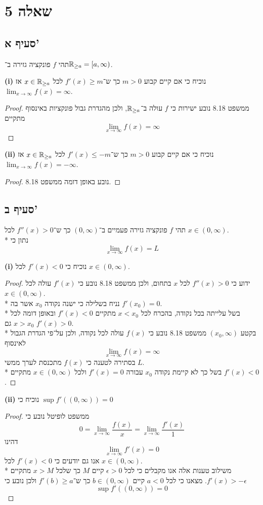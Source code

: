 \section{שאלה 5}
\subsection{סעיף א'}
תהי $f$ פונקציה גזירה ב־$\mathbb{R}_{\ge a} = [a, \infty)$. %

\textbf{(i)}
נוכיח כי אם קיים קבוע $m > 0$ כך ש־$f'(x) \ge m$ לכל $x \in \mathbb{R}_{\ge a}$ אז $\lim_{x \to \infty} f(x) = \infty$.
\begin{proof}
	ממשפט 8.18 נובע ישירות כי $f$ עולה ב־$\mathbb{R}_{\ge a}$, ולכן מהגדרת גבול פונקציות באינסוף מתקיים
	\[
		\lim_{x \to \infty} f(x) = \infty
	\]
\end{proof}

\textbf{(ii)}
נוכיח כי אם קיים קבוע $m > 0$ כך ש־$f'(x) \le -m$ לכל $x \in \mathbb{R}_{\ge a}$ אז $\lim_{x \to \infty} f(x) = - \infty$.
\begin{proof}
	נובע באופן דומה ממשפט 8.18.
\end{proof}

\subsection{סעיף ב'}
תהי $f$ פונקציה גזירה פעמיים ב־$(0, \infty)$ כך ש־$f''(x) > 0$ לכל $x \in (0, \infty)$. \\*
נתון כי
\[
	\lim_{x \to \infty} f(x) = L
\]

\textbf{(i)}
נוכיח כי $f'(x) < 0$ לכל $x \in (0, \infty)$.
\begin{proof}
	ידוע כי $f''(x) > 0$ לכל $x$ בתחום, ולכן ממשפט 8.18 נובע כי $f'(x)$ עולה לכל $x \in (0, \infty)$. \\*
	נניח בשלילה כי ישנה נקודה $x_0$ אשר בה $f'(x_0) = 0$. \\*
	בשל עלייתה בכל נקודה, בהכרח לכל $x < x_0$ מתקיים $f'(x) < 0$ ובאופן דומה לכל $x > x_0$ גם $f'(x) > 0$. \\*
	בקטע $(x_0, \infty)$ ממשפט 8.18 נובע כי $f(x)$ עולה לכל נקודה, ולכן על־פי הגדרת הגבול לאינסוף
	\[
		\lim_{x \to \infty} f(x) = \infty
	\]
	בסתירה לטענה כי $f(x)$ מתכנסת לערך ממשי $L$. \\*
	בשל כך לא קיימת נקודה $x_0$ עבורה $f'(x) = 0$ ולכל $x \in (0, \infty)$ מתקיים $f'(x) < 0$.
\end{proof}

\textbf{(ii)}
נוכיח כי $\sup f'((0, \infty)) = 0$
\begin{proof}
	ממשפט לופיטל נובע כי
	\[
		0 = \lim_{x \to \infty} \frac{f(x)}{x} = \lim_{x \to \infty} \frac{f'(x)}{1}
	\]
	דהינו
	\[
		\lim_{x \to \infty} f'(x) = 0
	\]
	אנו גם יודעים כי $f'(x) < 0$ לכל $x \in (0, \infty)$. \\*
	משילוב טענות אלה אנו מקבלים כי לכל $\epsilon > 0$ קיים $M$ כך שלכל $x > M$ מתקיים $f'(x) > -\epsilon$.
	מצאנו כי לכל $a < 0$ קיים $b \in (0, \infty)$ כך ש־$f'(b) \ge a$ ולכן נובע כי
	\[
		\sup f'((0, \infty)) = 0
	\]
\end{proof}

